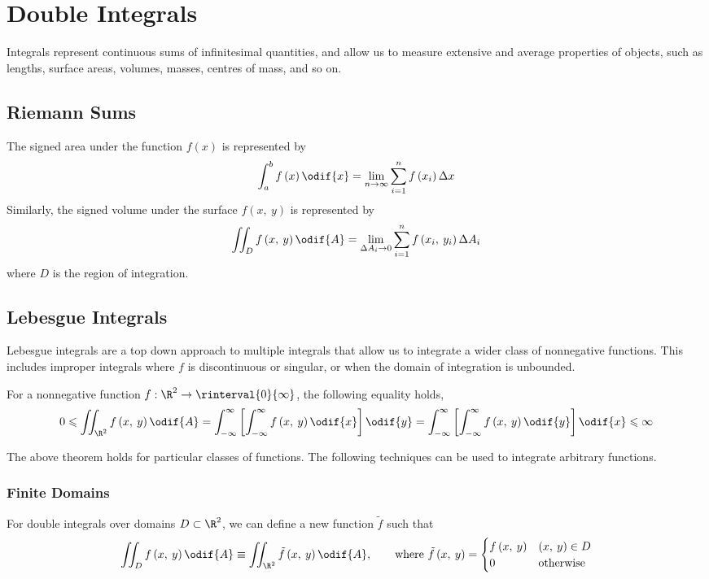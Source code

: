 \documentclass{article}
\begin{document}
\section{Double Integrals}
Integrals represent continuous sums of infinitesimal quantities, and
allow us to measure extensive and average properties of objects, such
as lengths, surface areas, volumes, masses, centres of mass, and so on.
\subsection{Riemann Sums}
The signed area under the function \(f\left( x \right)\) is represented
by
\begin{equation*}
    \int_a^b f\left( x \right) \odif{x} = \lim_{n \to \infty} \sum_{i = 1}^n f\left( x_i \right) \Delta x
\end{equation*}
Similarly, the signed volume under the surface \(f\left( x,\: y \right)\)
is represented by
\begin{equation*}
    \iint_D f\left( x,\: y \right) \odif{A} = \lim_{\Delta A_i \to 0} \sum_{i = 1}^n f\left( x_i,\: y_i \right) \Delta A_i
\end{equation*}
where \(D\) is the region of integration.
\subsection{Lebesgue Integrals}
Lebesgue integrals are a top down approach to multiple integrals that
allow us to integrate a wider class of nonnegative functions. This
includes improper integrals where \(f\) is discontinuous or singular,
or when the domain of integration is unbounded.
\begin{theorem}
    For a nonnegative function \(f : \R^2 \to \rinterval{0}{\infty}\),
    the following equality holds,
    \begin{equation*}
        0 \leqslant \iint_{\R^2} f\left( x,\: y \right) \odif{A} = \int_{-\infty}^\infty \left[ \int_{-\infty}^\infty f\left( x,\: y \right) \odif{x} \right] \odif{y} = \int_{-\infty}^\infty \left[ \int_{-\infty}^\infty f\left( x,\: y \right) \odif{y} \right] \odif{x} \leqslant \infty
    \end{equation*}
\end{theorem}
The above theorem holds for particular classes of functions. The
following techniques can be used to integrate arbitrary functions.
\subsubsection{Finite Domains}
For double integrals over domains \(D \subset \R^2\), we can define a
new function \(\tilde{f}\) such that
\begin{equation*}
    \iint_D f\left( x,\: y \right) \odif{A} \equiv \iint_{\R^2} \tilde{f}\left( x,\: y \right) \odif{A}, \qquad \text{where } \tilde{f}\left( x,\: y \right) =
    \begin{cases}
        f\left( x,\: y \right) & \left( x,\: y \right) \in D \\
        0                      & \text{otherwise}
    \end{cases}
\end{equation*}
\end{document}
